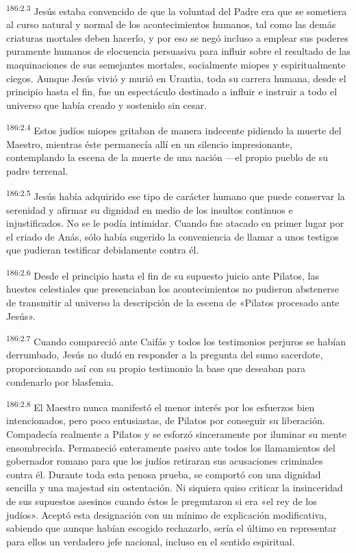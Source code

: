 \par 
\textsuperscript{186:2.3} Jesús estaba convencido de que la voluntad del Padre era que se sometiera al curso natural y normal de los acontecimientos humanos, tal como las demás criaturas mortales deben hacerlo, y por eso se negó incluso a emplear sus poderes puramente humanos de elocuencia persuasiva para influir sobre el resultado de las maquinaciones de sus semejantes mortales, socialmente miopes y espiritualmente ciegos. Aunque Jesús vivió y murió en Urantia, toda su carrera humana, desde el principio hasta el fin, fue un espectáculo destinado a influir e instruir a todo el universo que había creado y sostenido sin cesar.

\par 
\textsuperscript{186:2.4} Estos judíos miopes gritaban de manera indecente pidiendo la muerte del Maestro, mientras éste permanecía allí en un silencio impresionante, contemplando la escena de la muerte de una nación ---el propio pueblo de su padre terrenal.

\par 
\textsuperscript{186:2.5} Jesús había adquirido ese tipo de carácter humano que puede conservar la serenidad y afirmar su dignidad en medio de los insultos continuos e injustificados. No se le podía intimidar. Cuando fue atacado en primer lugar por el criado de Anás, sólo había sugerido la conveniencia de llamar a unos testigos que pudieran testificar debidamente contra él.

\par 
\textsuperscript{186:2.6} Desde el principio hasta el fin de su supuesto juicio ante Pilatos, las huestes celestiales que presenciaban los acontecimientos no pudieron abstenerse de transmitir al universo la descripción de la escena de «Pilatos procesado ante Jesús».

\par 
\textsuperscript{186:2.7} Cuando compareció ante Caifás y todos los testimonios perjuros se habían derrumbado, Jesús no dudó en responder a la pregunta del sumo sacerdote, proporcionando así con su propio testimonio la base que deseaban para condenarlo por blasfemia.

\par 
\textsuperscript{186:2.8} El Maestro nunca manifestó el menor interés por los esfuerzos bien intencionados, pero poco entusiastas, de Pilatos por conseguir su liberación. Compadecía realmente a Pilatos y se esforzó sinceramente por iluminar su mente ensombrecida. Permaneció enteramente pasivo ante todos los llamamientos del gobernador romano para que los judíos retiraran sus acusaciones criminales contra él. Durante toda esta penosa prueba, se comportó con una dignidad sencilla y una majestad sin ostentación. Ni siquiera quiso criticar la insinceridad de sus supuestos asesinos cuando éstos le preguntaron si era «el rey de los judíos». Aceptó esta designación con un mínimo de explicación modificativa, sabiendo que aunque habían escogido rechazarlo, sería el último en representar para ellos un verdadero jefe nacional, incluso en el sentido espiritual.


